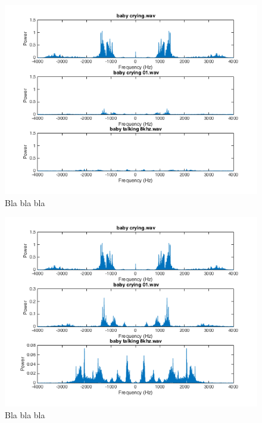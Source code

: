 \begin{figure}[h]
  \centering
  \includegraphics[width=1\textwidth]{sections/freq_spec_baby_linkaxis.png}
  \caption{Bla bla bla}
  \label{fig:baby_spec}
\end{figure}

\begin{figure}[h]
  \centering
  \includegraphics[width=1\textwidth]{sections/freq_spec_babyFix.png}
  \caption{Bla bla bla}
  \label{fig:enhanced}
\end{figure}


